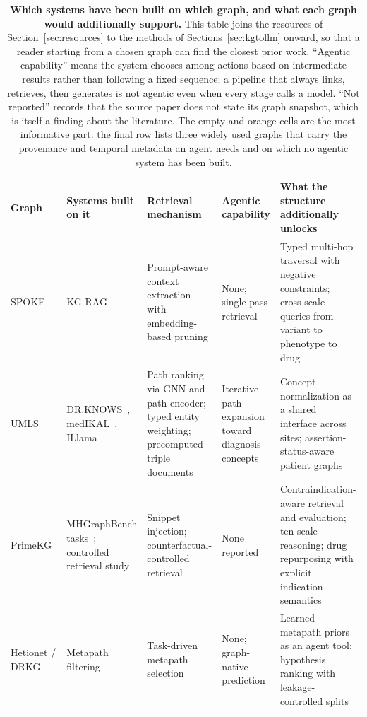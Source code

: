 \begin{table}[!t]
\centering
\caption{\textbf{Which systems have been built on which graph, and what each graph would additionally support.} This table joins the resources of Section~\ref{sec:resources} to the methods of Sections~\ref{sec:kgtollm} onward, so that a reader starting from a chosen graph can find the closest prior work. ``Agentic capability'' means the system chooses among actions based on intermediate results rather than following a fixed sequence; a pipeline that always links, retrieves, then generates is not agentic even when every stage calls a model. ``Not reported'' records that the source paper does not state its graph snapshot, which is itself a finding about the literature. The empty and orange cells are the most informative part: the final row lists three widely used graphs that carry the provenance and temporal metadata an agent needs and on which no agentic system has been built.}
\label{tab:enables}
\footnotesize
\begin{tabularx}{\textwidth}{@{}L{2.1cm} L{2.7cm} L{3.2cm} L{2.6cm} Y@{}}
\toprule
\textbf{Graph} & \textbf{Systems built on it} & \textbf{Retrieval mechanism} & \textbf{Agentic capability} & \textbf{What the structure additionally unlocks} \\
\midrule
SPOKE~\cite{morris2023spoke} & KG-RAG~\cite{soman2024kgrag} & Prompt-aware context extraction with embedding-based pruning & None; single-pass retrieval & Typed multi-hop traversal with negative constraints; cross-scale queries from variant to phenotype to drug \\
UMLS~\cite{umls} & DR.KNOWS~\cite{zuo2025drknows}, medIKAL~\cite{jia2025medikal}, ILlama~\cite{park2025illama} & Path ranking via GNN and path encoder; typed entity weighting; precomputed triple documents & Iterative path expansion toward diagnosis concepts & Concept normalization as a shared interface across sites; assertion-status-aware patient graphs \\
PrimeKG~\cite{chandak2023primekg} & MHGraphBench tasks~\cite{liu2026mhgraphbench}; controlled retrieval study~\cite{mandarapu2026controlled} & Snippet injection; counterfactual-controlled retrieval & None reported & Contraindication-aware retrieval and evaluation; ten-scale reasoning; drug repurposing with explicit indication semantics \\
Hetionet / DRKG~\cite{himmelstein2017hetionet,ioannidis2020drkg} & Metapath filtering~\cite{ratajczak2022metapath} & Task-driven metapath selection & None; graph-native prediction & Learned metapath priors as an agent tool; hypothesis ranking with leakage-controlled splits \\

\end{tabularx}
\end{table}
